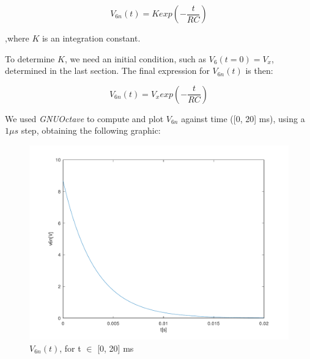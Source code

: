 






\begin{center}
  \begin{equation}
    V_{6n}(t) = K exp\left(-\frac{t}{RC}\right)
  \end{equation} 
\end{center}


,where $K$ is an integration constant.

To determine $K$, we need an initial condition, such as $V_6(t=0) = V_x$, determined in the last section. The final expression for $V_{6n}(t)$ is then:

\begin{center}
  \begin{equation}
    V_{6n}(t) = V_x exp\left(-\frac{t}{RC}\right)
  \end{equation} 
\end{center}



We used \textit{GNUOctave} to compute and plot $V_{6n}$ against time ([0, 20] ms), using a $1\mu s$ step, obtaining the following graphic:


\begin{figure}[h] \centering
\includegraphics[width=0.6\linewidth]{../mat/t2-t3.pdf}
\caption{$V_{6n}(t)$, for t $\in$ [0, 20] ms}
\label{fig4}
\end{figure}


